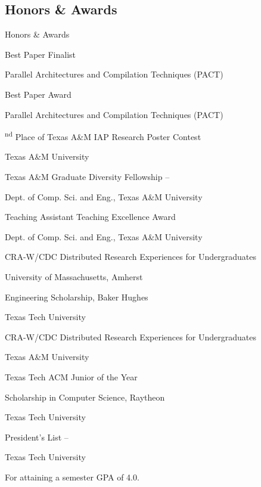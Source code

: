 \documentclass[a4paper,10pt,oneside]{article}
\begin{document}
\begin{body}

\section{Honors \& Awards}
{Honors\newline
\& Awards}

Best Paper Finalist
\hfill
{}
\par
Parallel Architectures and Compilation Techniques (PACT)

\EntryGap
Best Paper Award
\hfill
{}
\par
Parallel Architectures and Compilation Techniques (PACT)

\textsuperscript{nd} Place of Texas A\&M IAP Research Poster Contest
\hfill
{}
\par
Texas A\&M University

\EntryGap
Texas A\&M Graduate Diversity Fellowship
\hfill
{}--
\par
Dept. of Comp. Sci. and Eng., Texas A\&M University

\EntryGap
Teaching Assistant Teaching Excellence Award
\hfill
{}
\par
Dept. of Comp. Sci. and Eng., Texas A\&M University

\EntryGap
CRA-W/CDC Distributed Research Experiences for Undergraduates
\hfill
{}
\par
University of Massachusetts, Amherst

\EntryGap
Engineering Scholarship,
Baker Hughes
\hfill
{}
\par
Texas Tech University

\EntryGap
CRA-W/CDC Distributed Research Experiences for Undergraduates
\hfill
{}
\par
Texas A\&M University

\EntryGap
Texas Tech ACM Junior of the Year
\hfill
{}

\EntryGap
Scholarship in Computer Science,
Raytheon
\hfill
{}
\par
Texas Tech University

\EntryGap
President's List
\hfill
{} --
\par
Texas Tech University
\begin{detail}
For attaining a semester GPA of 4.0.
\end{detail}





\end{body}
\end{document}
